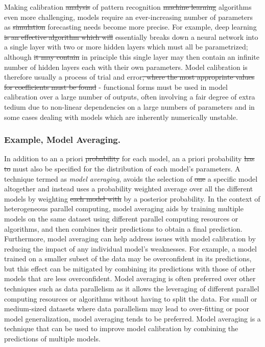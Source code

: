 \documentclass[10pt]{article}[draft]
\begin{document}
Making calibration \st{analysis} of pattern recognition \st{machine learning} algorithms even more challenging, models require an ever-increasing number of parameters as \st{simulation} forecasting needs become more precise.  For example, deep learning \st{is an effective algorithm which will} essentially breaks down a neural network into a single layer with two or more hidden layers which must all be parametrized; although \st{it may contain} in principle this single layer may then contain an infinite number of hidden layers each with their own parameters. 
Model calibration is therefore usually a process of trial and error\st{, where the most appropriate values for coefficients must be found} - functional forms must be used in model calibration over a large number of outputs, often involving a fair degree of extra tedium due to non-linear dependencies on a large numbers of parameters and in some cases dealing with models which are inherently numerically unstable. 

\subsubsection{Example, Model Averaging.}
In addition to  an a priori \st{probability} for each model, an a priori probability \st{has to} must also be specified for the distribution of each model’s parameters.  A technique termed as \emph{model averaging}, avoids the selection of \st{one} a specific model altogether and instead uses a probability weighted average over all the different models by weighting \st{each model with} by a posterior probability. In the context of heterogeneous parallel computing, model averaging aids by training multiple models on the same dataset using different parallel computing resources or algorithms, and then combines their predictions to obtain a final prediction. Furthermore, model averaging can help address issues with model calibration by reducing the impact of any individual model's weaknesses. For example, a model trained on a smaller subset of the data may be overconfident in its predictions, but this effect can be mitigated by combining its predictions with those of other models that are less overconfident. Model averaging is often preferred over other techniques such as data parallelism as  it allows the leveraging of different parallel computing resources or algorithms without having to split the data. For small or medium-sized datasets where data parallelism may lead to over-fitting or poor model generalization, model averaging tends to be preferred. Model averaging is a technique that can be used to improve model calibration by combining the predictions of multiple models. 
\end{document}
